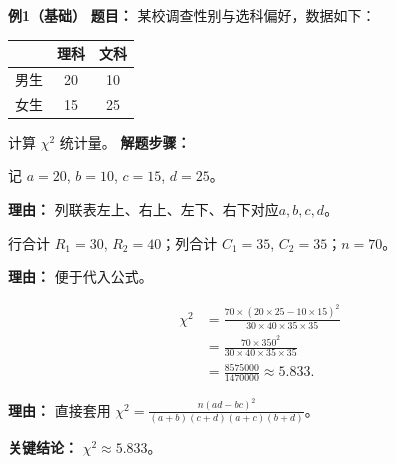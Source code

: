 \textbf{\textcolor{CExample}{例1（基础）}}
\textbf{\textcolor{CExample}{题目：}}
某校调查性别与选科偏好，数据如下：
\begin{center}

	\begin{tabular}
		{c|cc} & 理科 & 文科 \\ \hline 男生 & 20 & 10 \\ 女生 & 15 & 25
	\end{tabular}

\end{center}
计算 $\chi^2$ 统计量。
\textbf{\textcolor{CExample}{解题步骤：}}
\begin{description}[style=nextline, leftmargin=2.8em, labelsep=0.5em, itemsep=0.45em]
	\item[\textbf{第一步（标注单元格）：}]
		记 $a=20$, $b=10$, $c=15$, $d=25$。
		\par\textbf{理由：} 列联表左上、右上、左下、右下对应$a,b,c,d$。
	\item[\textbf{第二步（计算合计数）：}]
		行合计 $R_1=30$, $R_2=40$；列合计 $C_1=35$, $C_2=35$；$n=70$。
		\par\textbf{理由：} 便于代入公式。
	\item[\textbf{第三步（代入公式计算）：}]
		\[
			\begin{aligned}
				\chi^2 &= \frac{70\times(20\times25-10\times15)^2}{30\times40\times35\times35} \\ &= \frac{70\times350^2}{30\times40\times35\times35} \\ &= \frac{8575000}{1470000} \approx 5.833.
		\end{aligned}
		\]
		\par\textbf{理由：} 直接套用 $\chi^2 = \frac{n(ad-bc)^2}{(a+b)(c+d)(a+c)(b+d)}$。
\end{description}
\textbf{\textcolor{CExample}{关键结论：}}
$\chi^2 \approx 5.833$。

